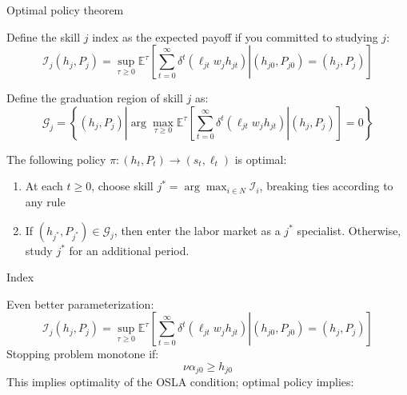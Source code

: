 \documentclass[compress, 8pt]{beamer}
\newcommand{\sbr}[1]{\left[ #1 \right]}
\newcommand{\pr}[1]{\left( #1 \right)}
\newcommand{\ce}[2]{\left[\left. #1 \right\vert #2 \right]}
\begin{document}
\begin{frame}{Optimal policy theorem}

Define the skill $j$ index as the expected payoff if you committed to studying $j$:
\begin{equation*}
\mathcal{I}_j (h_j, P_j) = \sup_{\tau \geq 0} \mathbb{E}^\tau
\ce{
   \sum_{t=0}^\infty \delta^t \pr{\ell_{jt} w_j h_{jt}}}
   {(h_{j0}, P_{j0}) = (h_j, P_j)
}
\end{equation*}

Define the graduation region of skill $j$ as: 
\begin{equation*}
\mathcal{G}_j = \left\{ (h_j, P_j) \left\vert
   \arg \max_{\tau \geq 0} 
   \mathbb{E}^\tau \ce{\sum_{t=0}^\infty \delta^t \pr{\ell_{jt} w_j h_{jt}}}
   {(h_j, P_j)} = 0
   \right. \right\}
\end{equation*}

The following policy $\pi: (h_t, P_t) \to (s_t, \ell_t)$ is optimal: 
\begin{enumerate}
	\item At each $t \geq 0$, choose skill $j^* = \arg \max_{i \in N} \mathcal{I}_i$, breaking ties according to any rule
	\item If $(h_{j^*}, P_{j^*}) \in \mathcal{G}_{j}$, then enter the labor market as a $j^*$ specialist. Otherwise, study $j^*$ for an additional period.  
\end{enumerate}

\end{frame}

\begin{frame}{Index}

Even better parameterization:
\begin{equation*}
\mathcal{I}_j (h_j, P_j) = \sup_{\tau \geq 0} \mathbb{E}^\tau
\ce{
   \sum_{t=0}^\infty \delta^t \pr{\ell_{jt} w_j h_{jt}}}
   {(h_{j0}, P_{j0}) = (h_j, P_j)
}
\end{equation*}
Stopping problem monotone if: 
\begin{equation*}
    \nu \alpha_{j0} \geq h_{j0}
\end{equation*}
This implies optimality of the OSLA condition; optimal policy implies:


\end{frame}
\end{document}
